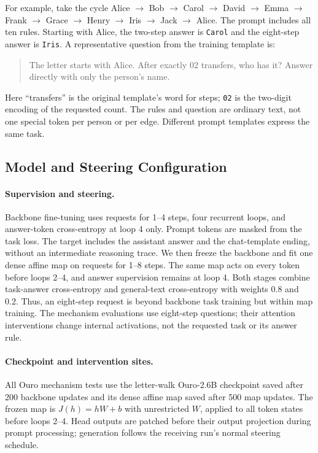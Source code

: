 \documentclass{article}
\begin{document}
For example, take the cycle Alice $\to$ Bob $\to$ Carol $\to$ David $\to$ Emma $\to$ Frank $\to$ Grace $\to$ Henry $\to$ Iris $\to$ Jack $\to$ Alice. The prompt includes all ten rules. Starting with Alice, the two-step answer is \texttt{Carol} and the eight-step answer is \texttt{Iris}. A representative question from the training template is:
\begin{quote}\small
The letter starts with Alice. After exactly 02 transfers, who has it? Answer directly with only the person's name.
\end{quote}
Here ``transfers'' is the original template's word for steps; \texttt{02} is the two-digit encoding of the requested count. The rules and question are ordinary text, not one special token per person or per edge. Different prompt templates express the same task.

\subsection{Model and Steering Configuration}
\label{app:ouro-config}
\paragraph{Supervision and steering.}
Backbone fine-tuning uses requests for 1--4 steps, four recurrent loops, and answer-token cross-entropy at loop 4 only. Prompt tokens are masked from the task loss. The target includes the assistant answer and the chat-template ending, without an intermediate reasoning trace. We then freeze the backbone and fit one dense affine map on requests for 1--8 steps. The same map acts on every token before loops 2--4, and answer supervision remains at loop 4. Both stages combine task-answer cross-entropy and general-text cross-entropy with weights 0.8 and 0.2. Thus, an eight-step request is beyond backbone task training but within map training. The mechanism evaluations use eight-step questions; their attention interventions change internal activations, not the requested task or its answer rule.

\paragraph{Checkpoint and intervention sites.}
All Ouro mechanism tests use the letter-walk Ouro-2.6B checkpoint saved after 200 backbone updates and its dense affine map saved after 500 map updates. The frozen map is $J(h)=hW+b$ with unrestricted $W$, applied to all token states before loops 2--4. Head outputs are patched before their output projection during prompt processing; generation follows the receiving run's normal steering schedule.
\end{document}
